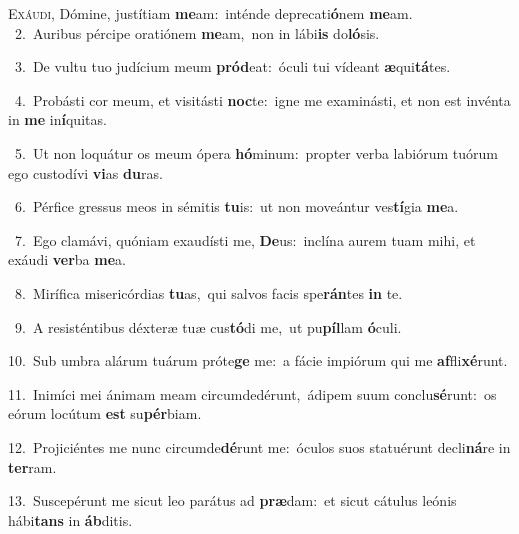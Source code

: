 \lettrine{\initial\textcolor{\initialcolor}{E}}{xáudi,} Dómine, justítiam \textbf{me}\-am:~\star inténde deprecati\-\textbf{ó}\-nem \textbf{me}\-am.\\
{\numbfont\textcolor{\numbcolor}{~2.}}~Auribus pércipe oratiónem \textbf{me}\-am,~\star non in lábi\textbf{is} do\-\textbf{ló}\-sis.\par
{\numbfont\textcolor{\numbcolor}{~3.}}~De vultu tuo judícium meum \textbf{pród}\-eat:~\star óculi tui vídeant \textbf{æ}\-qui\-\textbf{tá}\-tes.\par
{\numbfont\textcolor{\numbcolor}{~4.}}~Probásti cor meum, et visitásti \textbf{noc}\-te:~\star igne me examinásti, et non est invénta in \textbf{me} in\-\textbf{í}\-quitas.\par
{\numbfont\textcolor{\numbcolor}{~5.}}~Ut non loquátur os meum ópera \textbf{hó}\-minum:~\star propter verba labiórum tuórum ego custodívi \textbf{vi}\-as \textbf{du}\-ras.\par
{\numbfont\textcolor{\numbcolor}{~6.}}~Pérfice gressus meos in sémitis \textbf{tu}\-is:~\star ut non moveántur ves\-\textbf{tí}\-gia \textbf{me}\-a.\par
{\numbfont\textcolor{\numbcolor}{~7.}}~Ego clamávi, quóniam exaudísti me, \textbf{De}\-us:~\star inclína aurem tuam mihi, et exáudi \textbf{ver}\-ba \textbf{me}\-a.\par
{\numbfont\textcolor{\numbcolor}{~8.}}~Mirífica misericórdias \textbf{tu}\-as,~\star qui salvos facis spe\-\textbf{rán}\-tes \textbf{in} te.\par
{\numbfont\textcolor{\numbcolor}{~9.}}~A resisténtibus déxteræ tuæ cus\-\textbf{tó}\-di me,~\star ut pu\-\textbf{píl}\-lam \textbf{ó}\-culi.\par
{\numbfont\textcolor{\numbcolor}{10.}}~Sub umbra alárum tuárum próte\textbf{ge} me:~\star a fácie impiórum qui me \textbf{af}\-fli\-\textbf{xé}\-runt.\par
{\numbfont\textcolor{\numbcolor}{11.}}~Inimíci mei ánimam meam circumdedérunt,~\dagger ádipem suum conclu\-\textbf{sé}\-runt:~\star os eórum locútum \textbf{est} su\-\textbf{pér}\-biam.\par
{\numbfont\textcolor{\numbcolor}{12.}}~Projiciéntes me nunc circumde\-\textbf{dé}\-runt me:~\star óculos suos statuérunt decli\-\textbf{ná}\-re in \textbf{ter}\-ram.\par
{\numbfont\textcolor{\numbcolor}{13.}}~Suscepérunt me sicut leo parátus ad \textbf{præ}\-dam:~\star et sicut cátulus leónis hábi\textbf{tans} in \textbf{áb}\-ditis.\par
